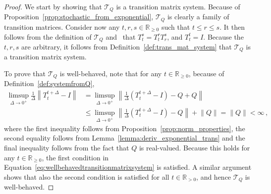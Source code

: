 \documentclass[10pt,a4paper]{paper}
\theoremstyle{definition}
\newcommand{\reals}{\mathbb{R}}
\newcommand{\realspos}{\reals_{>0}}
\newcommand{\realsnonneg}{\reals_{\geq 0}}
\newcommand{\norm}[1]{\left\lVert #1 \right\rVert}
\begin{document}
\propsystemQ*
\begin{proof}
We start by showing that $\mathcal{T}_Q$ is a transition matrix system. Because of Proposition~\ref{prop:stochastic_from_exponential}, $\mathcal{T}_Q$ is clearly a family of transition matrices. Consider now any $t,r,s\in\realsnonneg$ such that $t\leq r\leq s$. It then follows from the definition of $\mathcal{T}_Q$ and~\cite[Theorem 2.1.1]{norris1998markov} that $T_t^s=T_t^rT_r^s$, and $T_t^t=I$. Because the $t,r,s$ are arbitrary, it follows from Definition~\ref{def:trans_mat_system} that $\mathcal{T}_Q$ is a transition matrix system.

To prove that $\mathcal{T}_Q$ is well-behaved, note that for any $t\in\realsnonneg$, because of Definition~\ref{def:systemfromQ},
\begin{align*}
\limsup_{\Delta\to 0^+}\frac{1}{\Delta}\norm{T_t^{t+\Delta}-I} 
&=\limsup_{\Delta\to 0^+}\norm{\frac{1}{\Delta}(T_t^{t+\Delta}-I)-Q+Q}\\
&\leq\limsup_{\Delta\to 0^+}\norm{\frac{1}{\Delta}(T_t^{t+\Delta}-I)-Q}+\norm{Q}  
= \norm{Q} < \infty\,,
\end{align*}
where the first inequality follows from Proposition~\ref{prop:norm_properties}, the second equality follows from Lemma~\ref{lemma:deriv_exponential_trans} and the final inequality follows from the fact that $Q$ is real-valued. Because this holds for any $t\in\realsnonneg$, the first condition in Equation~\eqref{eq:wellbehavedtransitionmatrixsystem} is satisfied. A similar argument shows that also the second condition is satisfied for all $t\in\realspos$, and hence $\mathcal{T}_Q$ is well-behaved.
\end{proof}
\end{document}
